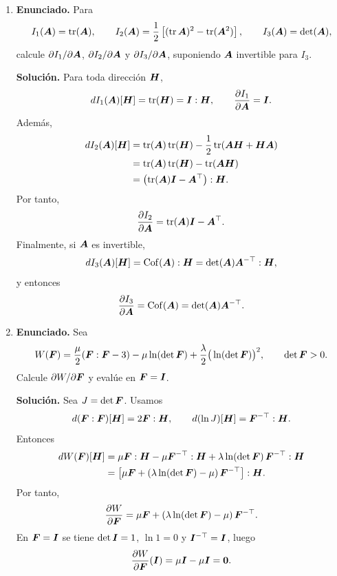 \documentclass[11pt]{article}
\newcommand{\pd}[2]{\frac{\partial #1}{\partial #2}}
\def\ten   #1{\mbox{\boldmath $#1$}{}}
\DeclareMathOperator{\tr}{tr}
\DeclareMathOperator{\Cof}{Cof}
\begin{document}
\begin{enumerate}[label=\textbf{\arabic*.}, leftmargin=*]
    \item \textbf{Enunciado.} Para
    \[
        I_1(\ten A)=\tr(\ten A),\qquad
        I_2(\ten A)=\frac12\left[(\tr\ten A)^2-\tr(\ten A^2)\right],
        \qquad
        I_3(\ten A)=\det(\ten A),
    \]
    calcule $\partial I_1/\partial\ten A$, $\partial I_2/\partial\ten A$ y $\partial I_3/\partial\ten A$, suponiendo $\ten A$ invertible para $I_3$.

    \textbf{Solución.} Para toda dirección $\ten H$,
    \[
        dI_1(\ten A)[\ten H]=\tr(\ten H)=\ten I:\ten H,
        \qquad
        \pd{I_1}{\ten A}=\ten I.
    \]
    Además,
    \begin{align*}
        dI_2(\ten A)[\ten H]
        &=
        \tr(\ten A)\tr(\ten H)
        -\frac12\tr(\ten A\ten H+\ten H\ten A)\\
        &=
        \tr(\ten A)\tr(\ten H)-\tr(\ten A\ten H)\\
        &=
        \left(\tr(\ten A)\ten I-\ten A^\top\right):\ten H.
    \end{align*}
    Por tanto,
    \[
        \pd{I_2}{\ten A}=\tr(\ten A)\ten I-\ten A^\top.
    \]
    Finalmente, si $\ten A$ es invertible,
    \[
        dI_3(\ten A)[\ten H]
        =
        \Cof(\ten A):\ten H
        =
        \det(\ten A)\ten A^{-\top}:\ten H,
    \]
    y entonces
    \[
        \pd{I_3}{\ten A}=\Cof(\ten A)=\det(\ten A)\ten A^{-\top}.
    \]

    \item \textbf{Enunciado.} Sea
    \[
        W(\ten F)=\frac{\mu}{2}(\ten F:\ten F-3)-\mu\ln(\det\ten F)
        +\frac{\lambda}{2}\big(\ln(\det\ten F)\big)^2,
        \qquad \det\ten F>0.
    \]
    Calcule $\partial W/\partial\ten F$ y evalúe en $\ten F=\ten I$.

    \textbf{Solución.} Sea $J=\det\ten F$. Usamos
    \[
        d(\ten F:\ten F)[\ten H]=2\ten F:\ten H,
        \qquad
        d(\ln J)[\ten H]=\ten F^{-\top}:\ten H.
    \]
    Entonces
    \begin{align*}
        dW(\ten F)[\ten H]
        &=
        \mu\ten F:\ten H
        -\mu\ten F^{-\top}:\ten H
        +\lambda\ln(\det\ten F)\,\ten F^{-\top}:\ten H\\
        &=
        \left[\mu\ten F+\left(\lambda\ln(\det\ten F)-\mu\right)\ten F^{-\top}\right]:\ten H.
    \end{align*}
    Por tanto,
    \[
        \pd{W}{\ten F}
        =
        \mu\ten F+\left(\lambda\ln(\det\ten F)-\mu\right)\ten F^{-\top}.
    \]
    En $\ten F=\ten I$ se tiene $\det\ten I=1$, $\ln 1=0$ y $\ten I^{-\top}=\ten I$, luego
    \[
        \pd{W}{\ten F}(\ten I)=\mu\ten I-\mu\ten I=\ten 0.
    \]


\end{enumerate}
\end{document}
